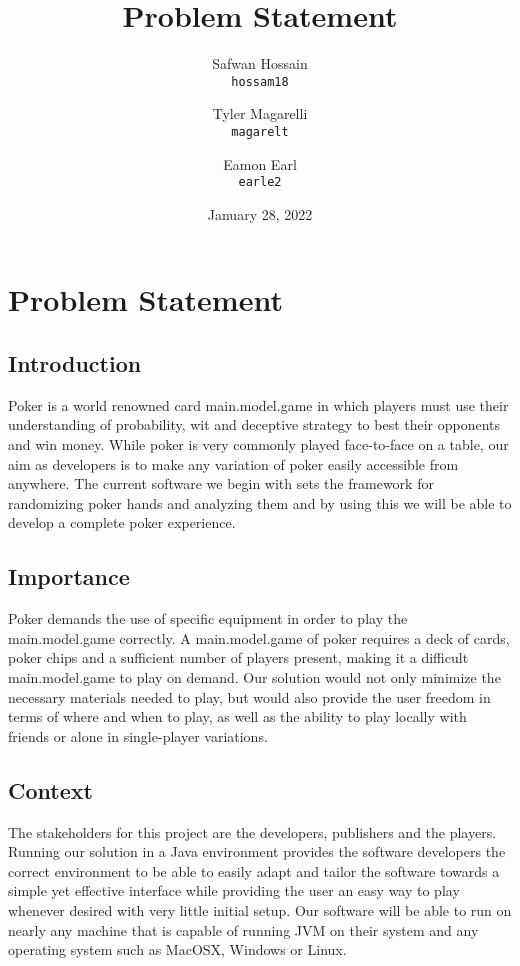 \documentclass{article}
\title{Problem Statement}
\author{
  Safwan Hossain\\
  \texttt{hossam18}\\
  \and
  Tyler Magarelli\\
  \texttt{magarelt}\\
  \and
  Eamon Earl\\
  \texttt{earle2}
}
\date{January 28, 2022}
\begin{document}
\maketitle
\newpage

\section*{Problem Statement}
\subsection*{Introduction}
    Poker is a world renowned card main.model.game in which players must use their understanding of probability, wit and deceptive strategy to best their opponents and win money. While poker is very commonly played face-to-face on a table, our aim as developers is to make any variation of poker easily accessible from anywhere. The current software we begin with sets the framework for randomizing poker hands and analyzing them and by using this we will be able to develop a complete poker experience.
\subsection*{Importance}
    Poker demands the use of specific equipment in order to play the main.model.game correctly. A main.model.game of poker requires a deck of cards, poker chips and a sufficient number of players present, making it a difficult main.model.game to play on demand. Our solution would not only minimize the necessary materials needed to play, but would also provide the user freedom in terms of where and when to play, as well as the ability to play locally with friends or alone in single-player variations.

\subsection*{Context}
    The stakeholders for this project are the developers, publishers and the players. 
    \\
    Running our solution in a Java environment provides the software developers the correct environment to be able to easily adapt and tailor the software towards a simple yet effective interface while providing the user an easy way to play whenever desired with very little initial setup. Our software will be able to run on nearly any machine that is capable of running JVM on their system and any operating system such as MacOSX, Windows or Linux.
\end{document}
